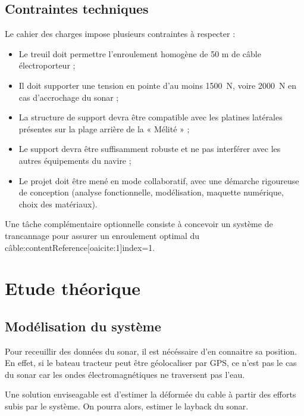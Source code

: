 \documentclass[12pt,a4paper]{report}
\begin{document}
\section{Contraintes techniques}


Le cahier des charges impose plusieurs contraintes à respecter :

\begin{itemize}
  \item Le treuil doit permettre l’enroulement homogène de 50 m de câble électroporteur ;
  \item Il doit supporter une tension en pointe d’au moins 1500~N, voire 2000~N en cas d’accrochage du sonar ;
  \item La structure de support devra être compatible avec les platines latérales présentes sur la plage arrière de la
  « Mélité » ;
  \item Le support devra être suffisamment robuste et ne pas interférer avec les autres équipements du navire ;
  \item Le projet doit être mené en mode collaboratif, avec une démarche rigoureuse de conception
  (analyse fonctionnelle, modélisation, maquette numérique, choix des matériaux).

\end{itemize}


Une tâche complémentaire optionnelle consiste à concevoir un système de trancannage pour assurer un enroulement
optimal du câble:contentReference[oaicite:1]{index=1}.




\chapter{Etude théorique}

\section{Modélisation du système}


Pour receuillir des données du sonar, il est nécéssaire d'en connaitre sa position. En effet, si le bateau tracteur
peut être géolocaliser par GPS, ce n'est pas le cas du sonar car les ondes électromagnétiques ne traversent pas l'eau.

Une solution enviseagable est d'estimer la déformée du cable à partir des efforts subis par le système.
On pourra alors, estimer le layback du sonar.
\end{document}
